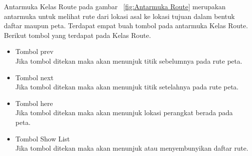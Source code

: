 \hspace{0.5cm} Antarmuka Kelas Route pada gambar ~\ref{fig:Antarmuka Route} merupakan antarmuka untuk melihat rute dari lokasi asal ke lokasi tujuan dalam bentuk daftar maupun peta. Terdapat empat buah tombol pada antarmuka Kelas Route. Berikut tombol yang terdapat pada Kelas Route. 
\begin{itemize}
	\item Tombol prev\\
	Jika tombol ditekan maka akan menunjuk titik sebelumnya pada rute peta.
	\item Tombol next\\
	Jika tombol ditekan maka akan menunjuk titik setelahnya pada rute peta.
	\item Tombol here\\
	Jika tombol ditekan maka akan menunjuk lokasi perangkat berada pada peta.
	\item Tombol Show List\\
	Jika tombol ditekan maka akan menunjuk atau menyembunyikan daftar rute.
\end{itemize}